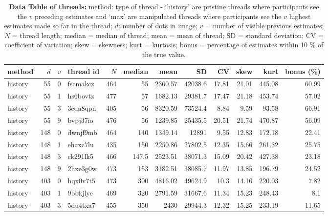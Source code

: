 \documentclass[9pt,a4paper,twocolumn,lineno]{article}
\begin{document}
\begin{table}\centering
\caption{\textbf{Data Table of threads:}  method: type of thread - `history' are pristine threads where participants see the $v$ preceding estimates and `max' are manipulated threads where participants see the $v$ highest estimates made so far in the thread; $d$: number of dots in image; $v$ = number of visible previous estimates; $N$ = thread length; median = median of thread; mean = mean of thread; SD = standard deviation; CV = coefficient of variation; skew = skewness; kurt = kurtosis; bonus = percentage of estimates within 10 \% of the true value.}

\begin{tabular}{lrrlrrrrrrrr}
\hline
 method   &    $d$ &   $v$ & thread id  &   $N$ &   median &     mean &       SD &    CV &   skew &   kurt &   bonus (\%) \\
\hline
 history  &   55 &   0 & fscmakcz & 464 &     55   &  2360.57 & 42038.6  & 17.81 &  21.01 & 445.08 &        60.99 \\
 history  &   55 &   1 & hs6bovtz & 477 &     57   &  1682.13 & 29381.7  & 17.47 &  21.18 & 453.74 &        57.02 \\
 history  &   55 &   3 & 3cda8qpn & 405 &     56   &  8320.59 & 73524.4  &  8.84 &   9.59 &  93.58 &        66.91 \\
 history  &   55 &   9 & bvpj37io & 476 &     56   &  1239.85 & 25435.5  & 20.51 &  21.74 & 470.87 &        56.09 \\
 history  &  148 &   0 & dwnjf9mb & 464 &    140   &  1349.14 & 12891    &  9.55 &  12.83 & 172.18 &        22.41 \\
 history  &  148 &   1 & ehaxc7lu & 435 &    150   &  2250.86 & 27802.5  & 12.35 &  15.66 & 261.32 &        25.75 \\
 history  &  148 &   3 & ck291lk5 & 466 &    147.5 &  2523.51 & 38071.3  & 15.09 &  20.42 & 427.38 &        23.18 \\
 history  &  148 &   9 & 2hxe3g0w & 473 &    153   &  3182.51 & 38085.7  & 11.97 &  13.85 & 196.79 &        24.52 \\
 history  &  403 &   0 & hqx0v7t5 & 473 &    300   &  4816.02 & 49624.9  & 10.3  &  14.16 & 220.03 &         7.82 \\
 history  &  403 &   1 & 9bbkjlye & 469 &    320   &  2791.59 & 31667.6  & 11.34 &  15.23 & 248.43 &         8.1  \\
 history  &  403 &   3 & 5du4txa7 & 455 &    350   &  2430    & 29944.3  & 12.32 &  15.25 & 233.19 &        11.65 \\

\end{tabular}
\end{table}
\end{document}
